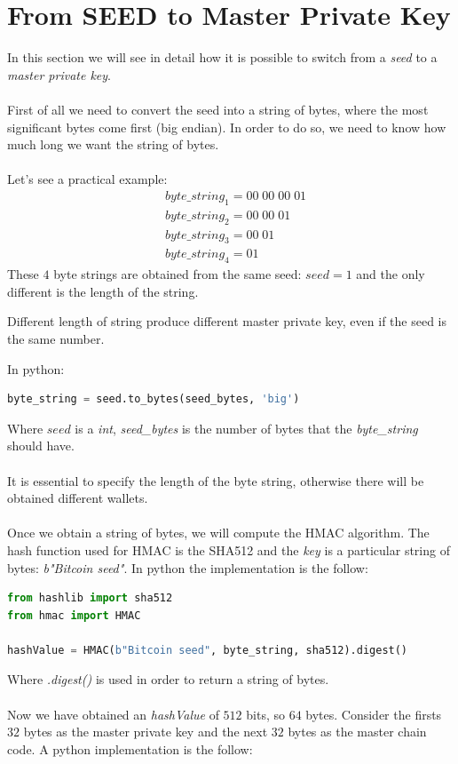 \section{From SEED to Master Private Key}
In this section we will see in detail how it is possible to switch from a \textit{seed} to a \textit{master private key}. \\ \\
First of all we need to convert the seed into a string of bytes, where the most significant bytes come first (big endian). In order to do so, we need to know how much long we want the string of bytes. \\ \\
Let's see a practical example:
\begin{equation*}
\begin{split}
&byte\_string_1=00\; 00\; 00 \; 01 \\
&byte\_string_2=00\; 00\; 01 \\
&byte\_string_3=00\; 01 \\
&byte\_string_4=01
\end{split}
\end{equation*}
These $4$ byte strings are obtained from the same seed: $seed=1$ and the only different is the length of the string.
\begin{remark}
	Different length of string produce different master private key, even if the seed is the same number.
\end{remark}
In python:
\begin{lstlisting}[language=Python]
byte_string = seed.to_bytes(seed_bytes, 'big')
\end{lstlisting}
Where $seed$ is a \textit{int}, \textit{seed\_bytes} is the number of bytes that the \textit{byte\_string} should have. \\ \\
It is essential to specify the length of the byte string, otherwise there will be obtained different wallets. \\ \\
Once we obtain a string of bytes, we will compute the HMAC algorithm. The hash function used for HMAC is the SHA512 and the \textit{key} is a particular string of bytes: \textit{b"Bitcoin seed"}. In python the implementation is the follow:

\begin{lstlisting}[language=Python]
from hashlib import sha512
from hmac import HMAC

hashValue = HMAC(b"Bitcoin seed", byte_string, sha512).digest()
\end{lstlisting}
Where \textit{.digest()} is used in order to return a string of bytes.
\\ \\
Now we have obtained an \textit{hashValue} of $512$ bits, so $64$ bytes. Consider the firsts $32$ bytes as the master private key and the next $32$ bytes as the master chain code. A python implementation is the follow:

